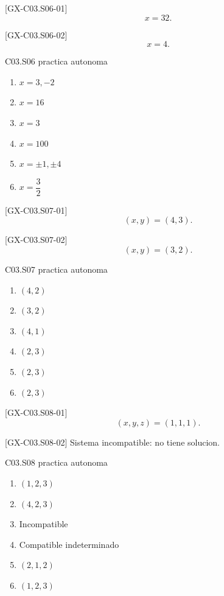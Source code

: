 \begin{shortanswer}{[GX-C03.S06-01]}
\[
x=32.
\]
\end{shortanswer}

\begin{shortanswer}{[GX-C03.S06-02]}
\[
x=4.
\]
\end{shortanswer}

\begin{shortanswer}{C03.S06 practica autonoma}
\begin{enumerate}[label=\textbf{PX-C03.S06-\arabic*:}, leftmargin=*]
  \item \(x=3,-2\)
  \item \(x=16\)
  \item \(x=3\)
  \item \(x=100\)
  \item \(x=\pm 1,\pm 4\)
  \item \(x=\dfrac{3}{2}\)
\end{enumerate}
\end{shortanswer}

\begin{shortanswer}{[GX-C03.S07-01]}
\[
(x,y)=(4,3).
\]
\end{shortanswer}

\begin{shortanswer}{[GX-C03.S07-02]}
\[
(x,y)=(3,2).
\]
\end{shortanswer}

\begin{shortanswer}{C03.S07 practica autonoma}
\begin{enumerate}[label=\textbf{PX-C03.S07-\arabic*:}, leftmargin=*]
  \item \((4,2)\)
  \item \((3,2)\)
  \item \((4,1)\)
  \item \((2,3)\)
  \item \((2,3)\)
  \item \((2,3)\)
\end{enumerate}
\end{shortanswer}

\begin{shortanswer}{[GX-C03.S08-01]}
\[
(x,y,z)=(1,1,1).
\]
\end{shortanswer}

\begin{shortanswer}{[GX-C03.S08-02]}
Sistema incompatible: no tiene solucion.
\end{shortanswer}

\begin{shortanswer}{C03.S08 practica autonoma}
\begin{enumerate}[label=\textbf{PX-C03.S08-\arabic*:}, leftmargin=*]
  \item \((1,2,3)\)
  \item \((4,2,3)\)
  \item Incompatible
  \item Compatible indeterminado
  \item \((2,1,2)\)
  \item \((1,2,3)\)
\end{enumerate}
\end{shortanswer}


